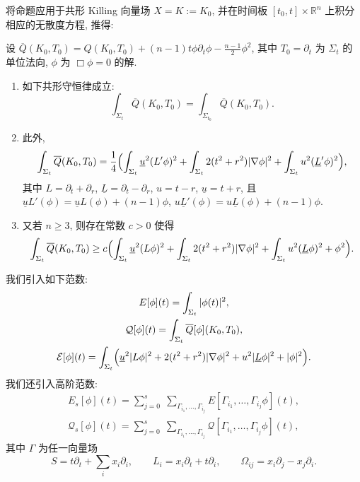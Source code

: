 将命题应用于共形 Killing 向量场 $X=K:=K_0$, 并在时间板 $[t_0,t]\times\mathbb{R}^n$ 上积分相应的无散度方程, 推得:
\begin{proposition}\label{prop:4.11}
设 $\overline{Q}(K_0,T_0)=Q(K_0,T_0)+(n-1)t\phi\partial_t\phi-\frac{n-1}{2}\phi^2$, 其中 $T_0=\partial_t$ 为 $\Sigma_t$ 的单位法向, $\phi$ 为 $\Box\phi=0$ 的解.
\begin{enumerate}[label=\roman*.]
\item 如下共形守恒律成立:
\begin{equation}
\int_{\Sigma_t}\overline{Q}(K_0,T_0)=\int_{\Sigma_{t_0}}\overline{Q}(K_0,T_0).\end{equation}
\item 此外,
\begin{equation}
\int_{\Sigma_t}\overline{Q}(K_0,T_0)=\frac14\Bigl(\int_{\Sigma_t}\underline{u}^2(L'\phi)^2+\int_{\Sigma_t}2(t^2+r^2)|\nabla\phi|^2+\int_{\Sigma_t}u^2(\underline{L}'\phi)^2\Bigr),\end{equation}
其中 $L=\partial_t+\partial_r$, $\underline{L}=\partial_t-\partial_r$, $u=t-r$, $\underline{u}=t+r$, 且 $\underline{u}L'(\phi)=\underline{u}L(\phi)+(n-1)\phi$, $u\underline{L}'(\phi)=u\underline{L}(\phi)+(n-1)\phi$.
\item 又若 $n\geq 3$, 则存在常数 $c>0$ 使得
\begin{equation}
\int_{\Sigma_t}\overline{Q}(K_0,T_0)\geq c\Bigl(\int_{\Sigma_t}\underline{u}^2(L\phi)^2+\int_{\Sigma_t}2(t^2+r^2)|\nabla\phi|^2+\int_{\Sigma_t}u^2(\underline{L}\phi)^2+\phi^2\Bigr).\end{equation}
\end{enumerate}
\end{proposition}

\begin{definition}\label{def:4.12}
我们引入如下范数:
\begin{gather}
E[\phi](t)=\int_{\Sigma_t}|\phi(t)|^2,\\
\mathcal{Q}[\phi](t)=\int_{\Sigma_t}\overline{Q}[\phi](K_0,T_0),\\
\mathcal{E}[\phi](t)=\int_{\Sigma_t}\Bigl(\underline{u}^2|L\phi|^2+2(t^2+r^2)|\nabla\phi|^2+u^2|\underline{L}\phi|^2+|\phi|^2\Bigr).\end{gather}
我们还引入高阶范数:
\begin{gather}
E_s[\phi](t)=\sum_{j=0}^s\;\sum_{\Gamma_{i_1},\ldots,\Gamma_{i_j}}E[\Gamma_{i_1},\ldots,\Gamma_{i_j}\phi](t),\\
\mathcal{Q}_s[\phi](t)=\sum_{j=0}^s\;\sum_{\Gamma_{i_1},\ldots,\Gamma_{i_j}}\mathcal{Q}[\Gamma_{i_1},\ldots,\Gamma_{i_j}\phi](t),\end{gather}
其中 $\Gamma$ 为任一向量场
\begin{equation}
S=t\partial_t+\sum_i x_i\partial_i,\qquad L_i=x_i\partial_t+t\partial_i,\qquad \Omega_{ij}=x_i\partial_j-x_j\partial_i.\end{equation}
\end{definition}


